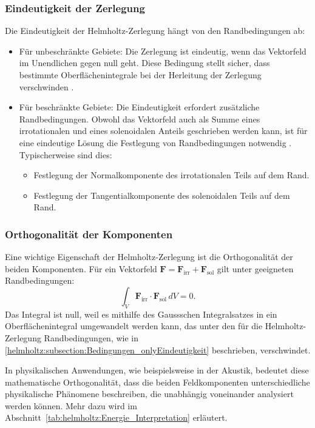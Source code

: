 \subsubsection{Eindeutigkeit der Zerlegung
\label{helmholtz:subsection:Bedingungen_onlyEindeutigkeit}}

Die Eindeutigkeit der Helmholtz-Zerlegung hängt von den Randbedingungen ab:

\begin{itemize}
\item Für unbeschränkte Gebiete: Die Zerlegung ist eindeutig, wenn
das Vektorfeld im Unendlichen gegen null geht.
Diese Bedingung stellt sicher, dass bestimmte Oberflächenintegrale
bei der Herleitung der Zerlegung verschwinden \cite{wiki:helmholtz}.

\item
Für beschränkte Gebiete: Die Eindeutigkeit erfordert zusätzliche
Randbedingungen.
Obwohl das Vektorfeld auch als Summe eines irrotationalen und eines
solenoidalen Anteils geschrieben werden kann, ist für eine eindeutige
Lösung die Festlegung von Randbedingungen notwendig \cite{wiki:helmholtz}.
Typischerweise sind dies:
  \begin{itemize}
    \item Festlegung der Normalkomponente des irrotationalen Teils
    auf dem Rand.
    \item Festlegung der Tangentialkomponente des solenoidalen Teils
    auf dem Rand.
  \end{itemize}
\end{itemize}

\subsubsection{Orthogonalität der Komponenten}

Eine wichtige Eigenschaft der Helmholtz-Zerlegung ist die Orthogonalität
der beiden Komponenten.
Für ein Vektorfeld
$\boldsymbol{F} = \boldsymbol{F}_{\text{irr}} + \boldsymbol{F}_{\text{sol}}$
gilt unter geeigneten Randbedingungen:
\begin{equation}
\int_V \boldsymbol{F}_{\text{irr}} \cdot \boldsymbol{F}_{\text{sol}} \, dV = 0.
\end{equation}
%
%
Das Integral ist null, weil es mithilfe des Gaussschen Integralsatzes
in ein Oberflächenintegral umgewandelt werden kann, das unter den
für die Helmholtz-Zerlegung Randbedingungen, wie in
\ref{helmholtz:subsection:Bedingungen_onlyEindeutigkeit} beschrieben,
verschwindet.
 
In physikalischen Anwendungen, wie beispielsweise in der Akustik,
bedeutet diese mathematische Orthogonalität, dass die beiden
Feldkomponenten unterschiedliche physikalische Phänomene beschreiben,
die unabhängig voneinander analysiert werden können.
Mehr dazu wird im Abschnitt~\ref{tab:helmholtz:Energie_Interpretation}
erläutert.



